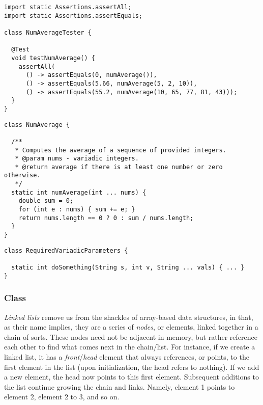 \begin{lstlisting}[language=MyJava]
import static Assertions.assertAll;
import static Assertions.assertEquals;

class NumAverageTester {

  @Test
  void testNumAverage() {
    assertAll(
      () -> assertEquals(0, numAverage()),
      () -> assertEquals(5.66, numAverage(5, 2, 10)),
      () -> assertEquals(55.2, numAverage(10, 65, 77, 81, 43)));
  }
}
\end{lstlisting}

\begin{lstlisting}[language=MyJava]
class NumAverage {

  /**
   * Computes the average of a sequence of provided integers.
   * @param nums - variadic integers.
   * @return average if there is at least one number or zero otherwise.
   */
  static int numAverage(int ... nums) {
    double sum = 0;
    for (int e : nums) { sum += e; }
    return nums.length == 0 ? 0 : sum / nums.length;
  }
}
\end{lstlisting}


\begin{lstlisting}[language=MyJava]
class RequiredVariadicParameters {

  static int doSomething(String s, int v, String ... vals) { ... }
}
\end{lstlisting}

\subsubsection*{ Class}
\emph{Linked lists} remove us from the shackles of array-based data structures, in that, as their name implies, they are a series of \emph{nodes}, or elements, linked together in a chain of sorts. These nodes need not be adjacent in memory, but rather reference each other to find what comes next in the chain/list. For instance, if we create a linked list, it has a \emph{front}/\emph{head} element that always references, or points, to the first element in the list (upon initialization, the head refers to nothing). If we add a new element, the head now points to this first element. Subsequent additions to the list continue growing the chain and links. Namely, element 1 points to element 2, element 2 to 3, and so on. 

